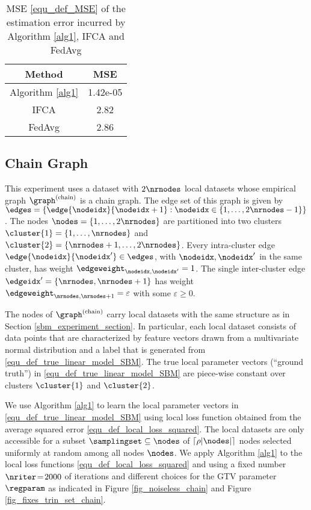 \documentclass[lettersize,journal]{IEEEtran}
\begin{document}
\begin{table}[htb]
    \centering
    \begin{tabular}{|c|c|} 
    \hline
    Method & MSE \\
    \hline
    Algorithm \ref{alg1} & 1.42e-05 \\ 
    IFCA & 2.82 \\ 
    FedAvg & 2.86 \\ 
    \hline
    \end{tabular}
\vspace*{3mm}
    \caption{MSE \eqref{equ_def_MSE} of the estimation error incurred by Algorithm \ref{alg1}, IFCA \cite{Ghosh2020} and FedAvg \cite{Sun2021DecentralizedFA}}
    \label{tab:sbm_table}
    \vspace{-3mm}
\end{table}

\subsection{Chain Graph} 
\label{chain_section}
This experiment uses a dataset with $2 \nrnodes$ local datasets whose empirical graph $\graph^{(\rm chain)}$ is a chain graph. 
The edge set of this graph is given by $\edges = \{ \edge{\nodeidx}{\nodeidx+1} : \nodeidx \in \{1,\ldots,2\nrnodes-1 \} \}$. 
The nodes $\nodes = \{1,\ldots,2 \nrnodes\}$ are partitioned into two clusters $\cluster{1} = \{1,\ldots,\nrnodes\}$ 
and $\cluster{2} = \{\nrnodes+1,\ldots,2 \nrnodes\}$. Every intra-cluster edge $\edge{\nodeidx}{\nodeidx'} \in \edges$, 
with $\nodeidx,\nodeidx'$ in the same cluster, has weight $\edgeweight_{\nodeidx,\nodeidx'} =1$. The single 
inter-cluster edge $\edgeidx' = \{\nrnodes,\nrnodes+1\}$ has weight $\edgeweight_{\nrnodes,\nrnodes+1}  = \varepsilon$ 
with some $\varepsilon \geq 0$. 

The nodes of $\graph^{(\rm chain)}$ carry local datasets with the same structure as in Section \ref{sbm_experiment_section}. 
In particular, each local dataset consists of data points that are characterized by feature vectors drawn from a 
multivariate normal distribution and a label that is generated from \eqref{equ_def_true_linear_model_SBM}. 
The true local parameter vectors (``ground truth'') in \eqref{equ_def_true_linear_model_SBM} are piece-wise 
constant over clusters $\cluster{1}$ and $\cluster{2}$. 

We use Algorithm \ref{alg1} to learn the local parameter vectors in \eqref{equ_def_true_linear_model_SBM} 
using local loss function obtained from the average squared error \eqref{equ_def_local_loss_squared}. 
The local datasets are only accessible for a subset $\samplingset \subseteq \nodes$ of $\lceil \rho |\nodes| \rceil$ 
nodes selected uniformly at random among all nodes $\nodes$. We apply Algorithm \ref{alg1} to the local loss 
functions \eqref{equ_def_local_loss_squared} and using a fixed number $\nriter\!=\!2000$ of iterations and 
different choices for the GTV parameter $\regparam$ as indicated in Figure \ref{fig_noiseless_chain} and Figure \ref{fig_fixes_trin_set_chain}. 
\end{document}

